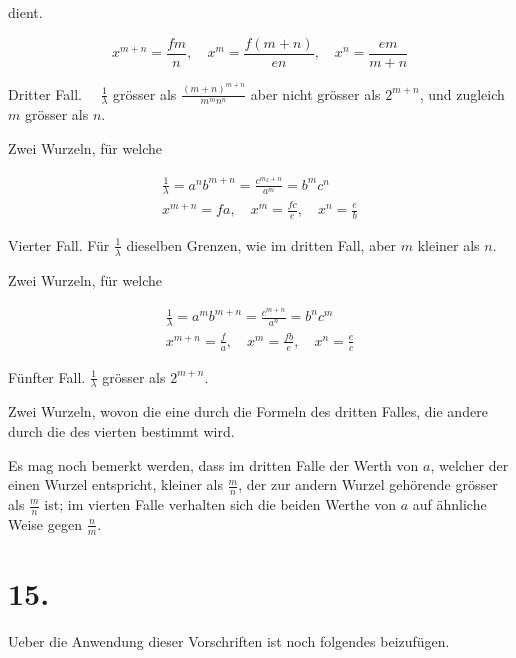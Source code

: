 \documentclass[10pt]{article}
\begin{document}
dient.

\[
x^{m+n}=\frac{f m}{n}, \quad x^{m}=\frac{f(m+n)}{e n}, \quad x^{n}=\frac{e m}{m+n}
\]

Dritter Fall. \(\quad \frac{1}{\lambda}\) grösser als \(\frac{(m+n)^{m+n}}{m^{m} n^{n}}\) aber nicht grösser als \(2^{m+n}\), und zugleich \(m\) grösser als \(n\).

Zwei Wurzeln, für welche

\[
\begin{gathered}
\frac{1}{\lambda}=a^{n} b^{m+n}=\frac{c^{m_{2}+n}}{a^{m}}=b^{m} c^{n} \\
x^{m+n}=f a, \quad x^{m}=\frac{f c}{e}, \quad x^{n}=\frac{e}{b}
\end{gathered}
\]

Vierter Fall. Für \(\frac{1}{\lambda}\) dieselben Grenzen, wie im dritten Fall, aber \(m\) kleiner als \(n\).

Zwei Wurzeln, für welche

\[
\begin{gathered}
\frac{1}{\lambda}=a^{m} b^{m+n}=\frac{c^{m+n}}{a^{n}}=b^{n} c^{m} \\
x^{m+n}=\frac{f}{a}, \quad x^{m}=\frac{f b}{e}, \quad x^{n}=\frac{e}{c}
\end{gathered}
\]

Fünfter Fall. \(\frac{1}{\lambda}\) grösser als \(2^{m+n}\).

Zwei Wurzeln, wovon die eine durch die Formeln des dritten Falles, die andere durch die des vierten bestimmt wird.

Es mag noch bemerkt werden, dass im dritten Falle der Werth von \(a\), welcher der einen Wurzel entspricht, kleiner als \(\frac{m}{n}\), der zur andern Wurzel gehörende grösser als \(\frac{m}{n}\) ist; im vierten Falle verhalten sich die beiden Werthe von \(a\) auf ähnliche Weise gegen \(\frac{n}{m}\).

\section*{15.}
Ueber die Anwendung dieser Vorschriften ist noch folgendes beizufügen.
\end{document}
